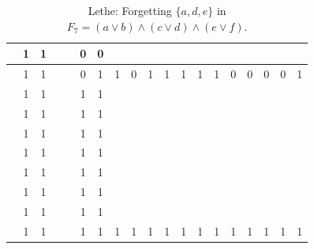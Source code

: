 \begin{table}[!tb]
\begin{tabular}{|c|c|c|c|c|c|c|c|c|c|c|c|c|c|c|c|c|c|c|}
        \rowcolor{blue!40}  & 1 & 1 &  &  & 0 & 0 &  &  &  &  &  &  &  &  &  &  &  &  \\ \hline
        \rowcolor{blue!40}  & 1 & 1 &  &  & 0 & 1 & 1 & 0 & 1 & 1 & 1 & 1 & 1 & 0 & 0 & 0 & 0 & 1 \\ \hline
        \rowcolor{red!40}  & 1 & 1 &  &  & 1 & 1 &  &  &  &  &  &  &  &  &  &  &  &  \\ \hline
        \rowcolor{red!40}  & 1 & 1 &  &  & 1 & 1 &  &  &  &  &  &  &  &  &  &  &  &  \\ \hline
        \rowcolor{red!40}  & 1 & 1 &  &  & 1 & 1 &  &  &  &  &  &  &  &  &  &  &  &  \\ \hline
        \rowcolor{red!40}  & 1 & 1 &  &  & 1 & 1 &  &  &  &  &  &  &  &  &  &  &  &  \\ \hline
        \rowcolor{red!40}  & 1 & 1 &  &  & 1 & 1 &  &  &  &  &  &  &  &  &  &  &  &  \\ \hline
        \rowcolor{red!40}  & 1 & 1 &  &  & 1 & 1 &  &  &  &  &  &  &  &  &  &  &  &  \\ \hline
        \rowcolor{red!40}  & 1 & 1 &  &  & 1 & 1 &  &  &  &  &  &  &  &  &  &  &  &  \\ \hline
        \rowcolor{red!40}  & 1 & 1 &  &  & 1 & 1 & 1 & 1 & 1 & 1 & 1 & 1 & 1 & 1 & 1 & 1 & 1 & 1 \\ \hline
    \end{tabular}
    \caption{Lethe: Forgetting $\{a, d, e\}$ in $F_{7} = (a \lor b) \land (c \lor d) \land (e \lor f)$.}
    \label{tab:lethe-F7-ade}
\end{table}
